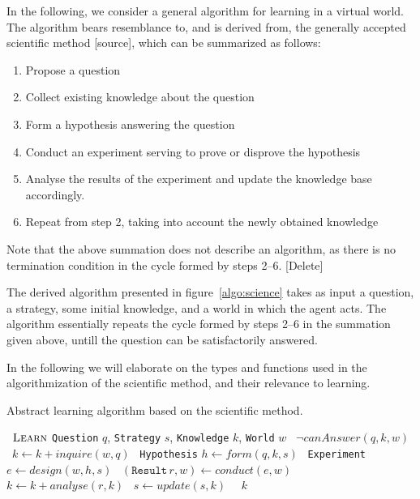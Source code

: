 \documentclass[../Master.tex]{subfiles}
\begin{document}
In the following, we consider a general algorithm for learning in a virtual world. The algorithm bears resemblance to, and is derived from, the generally accepted scientific method [source], which can be summarized as follows:

\begin{enumerate}
    \item Propose a question
    \item Collect existing knowledge about the question
    \item Form a hypothesis answering the question
    \item Conduct an experiment serving to prove or disprove the hypothesis
    \item Analyse the results of the experiment and update the knowledge base accordingly.
    \item Repeat from step 2, taking into account the newly obtained knowledge
\end{enumerate}

Note that the above summation does not describe an algorithm, as there is no termination condition in the cycle formed by steps 2--6. [Delete]

The derived algorithm presented in figure~\ref{algo:science} takes as input a question, a strategy, some initial knowledge, and a world in which the agent acts. The algorithm essentially repeats the cycle formed by steps 2--6 in the summation given above, untill the question can be satisfactorily answered.

In the following we will elaborate on the types and functions used in the algorithmization of the scientific method, and their relevance to learning.

\begin{algorithm}\label{algo:science}
    \caption{Abstract learning algorithm based on the scientific method.}

    \begin{algorithmic}
        \Function~{$\textsc{Learn}$} {\texttt{Question} $q$, \texttt{Strategy} $s$, \texttt{Knowledge} $k$, \texttt{World} $w$}
            \While~{$\neg canAnswer(q, k, w)$}
                \State~$k \gets k + inquire(w, q)$
                \State~\texttt{Hypothesis} $h \gets form(q, k, s)$
                \State~\texttt{Experiment} $e \gets design(w, h, s)$
                \State~$(\texttt{Result} \, r, w) \gets conduct(e, w)$
                \State~$k \gets k + analyse(r, k)$
                \State~$s \gets update(s, k)$
            \EndWhile%
            \State~\Return~$k$
        \EndFunction%
    \end{algorithmic}
\end{algorithm}
\end{document}
